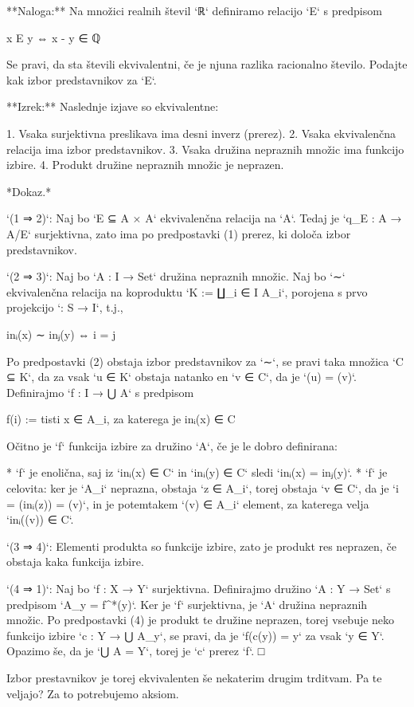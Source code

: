 **Naloga:** Na množici realnih števil `ℝ` definiramo relacijo `E` s predpisom

    x E y  ⇔  x - y ∈ ℚ

Se pravi, da sta števili ekvivalentni, če je njuna razlika racionalno število. Podajte kak
izbor predstavnikov za `E`.


**Izrek:** Naslednje izjave so ekvivalentne:

1. Vsaka surjektivna preslikava ima desni inverz (prerez).
2. Vsaka ekvivalenčna relacija ima izbor predstavnikov.
3. Vsaka družina nepraznih množic ima funkcijo izbire.
4. Produkt družine nepraznih množic je neprazen.

*Dokaz.*

`(1 ⇒ 2)`: Naj bo `E ⊆ A × A` ekvivalenčna relacija na `A`. Tedaj je `q_E : A → A/E`
surjektivna, zato ima po predpostavki (1) prerez, ki določa izbor predstavnikov.

`(2 ⇒ 3)`: Naj bo `A : I → Set` družina nepraznih množic. Naj bo `∼` ekvivalenčna relacija
na koproduktu `K := ∐_{i ∈ I} A_i`, porojena s prvo projekcijo `\fst : S → I`, t.j.,

    inᵢ(x) ∼ inⱼ(y) ⇔ i = j

Po predpostavki (2) obstaja izbor predstavnikov za `∼`, se pravi taka množica `C ⊆ K`, da
za vsak `u ∈ K` obstaja natanko en `v ∈ C`, da je `\fst(u) = \fst(v)`. Definirajmo `f : I →
⋃ A` s predpisom

    f(i) := tisti x ∈ A_i, za katerega je inᵢ(x) ∈ C

Očitno je `f` funkcija izbire za družino `A`, če je le dobro definirana:

* `f` je enolična, saj iz `inᵢ(x) ∈ C` in `inᵢ(y) ∈ C` sledi `inᵢ(x) = inⱼ(y)`.
* `f` je celovita: ker je `A_i` neprazna, obstaja `z ∈ A_i`, torej obstaja `v ∈ C`, da je
  `i = \fst(inᵢ(z)) = \fst(v)`, in je potemtakem `\snd(v) ∈ A_i` element, za katerega velja
  `inᵢ(\snd(v)) ∈ C`.

`(3 ⇒ 4)`: Elementi produkta so funkcije izbire, zato je produkt res neprazen, če obstaja
kaka funkcija izbire.

`(4 ⇒ 1)`: Naj bo `f : X → Y` surjektivna. Definirajmo družino `A : Y → Set` s
predpisom `A_y = f^*({y})`. Ker je `f` surjektivna, je `A` družina nepraznih
množic. Po predpostavki (4) je produkt te družine neprazen, torej vsebuje neko
funkcijo izbire `c : Y → ⋃ A_y`, se pravi, da je `f(c(y)) = y` za vsak `y ∈ Y`.
Opazimo še, da je `⋃ A = Y`, torej je `c` prerez `f`. □

Izbor prestavnikov je torej ekvivalenten še nekaterim drugim trditvam. Pa te veljajo? Za
to potrebujemo aksiom.

